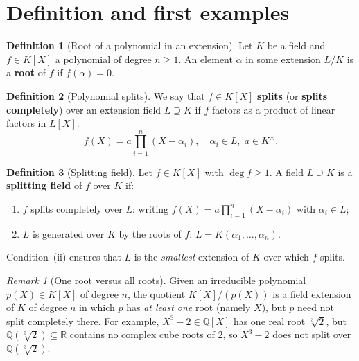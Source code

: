 \documentclass[12pt,a4paper,openany]{book}
\theoremstyle{definition}
\newtheorem{definition}{Definition}[chapter]
\theoremstyle{remark}
\newtheorem{remark}{Remark}[chapter]
\newcommand{\Q}{\mathbb{Q}}
\newcommand{\R}{\mathbb{R}}
\renewcommand{\deg}{\operatorname{deg}}
\begin{document}
\section{Definition and first examples}
\label{sec:splitting-def}

\begin{definition}[Root of a polynomial in an extension]
\label{def:root-extension}
Let $K$ be a field and $f \in K[X]$ a polynomial of degree $n \ge 1$.
An element $\alpha$ in some extension $L/K$ is a \textbf{root} of $f$
if $f(\alpha) = 0$.
\end{definition}

\begin{definition}[Polynomial splits]
\label{def:poly-splits}
We say that $f \in K[X]$ \textbf{splits} (or \textbf{splits
completely}) over an extension field $L \supseteq K$ if $f$ factors
as a product of linear factors in $L[X]$:
\[
  f(X) = a \prod_{i=1}^{n} (X - \alpha_i), \quad
  \alpha_i \in L,\; a \in K^{\times}.
\]
\end{definition}

\begin{definition}[Splitting field]
\label{def:splitting-field}
Let $f \in K[X]$ with $\deg f \ge 1$. A field $L \supseteq K$ is a
\textbf{splitting field} of $f$ over $K$ if:
\begin{enumerate}[label=(\roman*)]
  \item $f$ splits completely over $L$: writing
    $f(X) = a\prod_{i=1}^n (X - \alpha_i)$ with $\alpha_i \in L$;
  \item $L$ is generated over $K$ by the roots of $f$:
    $L = K(\alpha_1, \dots, \alpha_n)$.
\end{enumerate}
Condition~(ii) ensures that $L$ is the \emph{smallest} extension of $K$
over which $f$ splits.
\end{definition}

\begin{remark}[One root versus all roots]
\label{rem:one-vs-all}
Given an irreducible polynomial $p(X) \in K[X]$ of degree $n$, the
quotient $K[X]/(p(X))$ is a field extension of $K$ of degree $n$ in
which $p$ has \emph{at least one} root (namely $\overline{X}$), but
$p$ need not split completely there. For example, $X^3 - 2 \in
\Q[X]$ has one real root $\sqrt[3]{2}$, but $\Q(\sqrt[3]{2})
\subseteq \R$ contains no complex cube roots of $2$, so $X^3 - 2$
does not split over $\Q(\sqrt[3]{2})$.
\end{remark}
\end{document}
